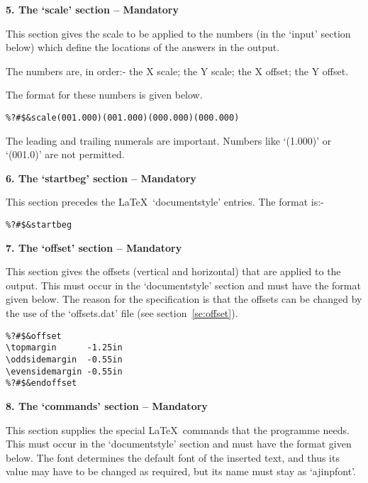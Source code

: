 \vspace*{0.2cm}
{\bf \large 5. The `scale' section -- Mandatory}
\vspace*{0.2cm}

This section gives the scale to be applied to the numbers (in the `input'
section below) which define the locations of the answers in the output.

The numbers are, in order:- the X scale; the Y scale; the X offset; the Y
offset.

The format for these numbers is given below.

\begin{verbatim}
%?#$&scale(001.000)(001.000)(000.000)(000.000)
\end{verbatim}

The leading and trailing numerals are important. Numbers like `(1.000)'
or `(001.0)' are not permitted.

\vspace*{0.2cm}
{\bf \large 6. The `startbeg' section -- Mandatory}
\vspace*{0.2cm}

This section precedes the \LaTeX\ `documentstyle' entries. The format is:-

\begin{verbatim}
%?#$&startbeg
\end{verbatim}

\vspace*{0.2cm}
{\bf \large 7. The `offset' section -- Mandatory}
\vspace*{0.2cm}

This section gives the offsets (vertical and horizontal) that are applied
to the output. This must occur in the `documentstyle' section and must have
the format given below. The reason for the specification is that the
offsets can be changed by the use of the `offsets.dat' file (see
section~\ref{se:offset}).

\begin{verbatim}
%?#$&offset
\topmargin      -1.25in
\oddsidemargin  -0.55in
\evensidemargin -0.55in
%?#$&endoffset
\end{verbatim}

\vspace*{0.2cm}
{\bf \large 8. The `commands' section -- Mandatory}
\vspace*{0.2cm}

This section supplies the special \LaTeX\ commands that the programme
needs. This must occur in the `documentstyle' section and must have the
format given below. The font determines the default font of the inserted
text, and thus its value may have to be changed as required, but its name
must stay as `ajinpfont'.

